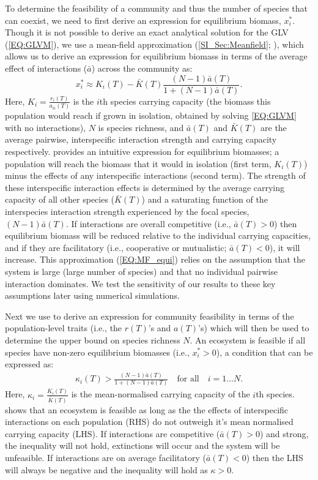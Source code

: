 \documentclass{article}
\begin{document}
To determine the feasibility of a community and thus the number of species that can coexist, we need to first derive an expression for equilibrium biomass, $x^*_i$. Though it is not possible to derive an exact analytical solution for the GLV (\cref{EQ:GLVM}), we use a mean-field approximation (\cref{SI_Sec:Meanfield};  \citet{Wilson2003,Wilson2004}), which allows us to derive an expression for equilibrium biomass in terms of the average effect of interactions ($\bar{a}$) across the community as: 
\begin{equation}\label{EQ:MF_equi}
  x^*_i \approx K_i(T) -  \bar{K}(T)  \frac{ (N-1)\bar{a}(T)}{1 + (N-1)\bar{a}(T)}. 
\end{equation}
Here, $K_i = \frac{r_i(T)}{a_{ii}(T)}$ is the $i$th species carrying capacity (the biomass this population would reach if grown in isolation, obtained by solving \cref{EQ:GLVM} with no interactions), $N$ is species richness, and $\bar{a}(T)$ and $\bar{K}(T)$ are the average pairwise, interspecific interaction strength and carrying capacity respectively.  provides an intuitive expression for equilibrium biomasses; a population will reach the biomass that it would in isolation (first term, $K_i(T)$) minus the effects of any interspecific interactions (second term). The strength of these interspecific interaction effects is determined by the average carrying capacity of all other species ($\bar{K}(T)$) and a saturating function of the interspecies interaction strength experienced by the focal species, $(N-1)\bar{a}(T)$. If interactions are overall competitive (i.e., $\bar{a}(T) > 0$) then equilibrium biomass will be reduced relative to the individual carrying capacities, and if they are facilitatory (i.e., cooperative or mutualistic; $ \bar{a}(T) < 0$), it will increase. This approximation (\cref{EQ:MF_equi}) relies on the assumption that the system is large (large number of species) and that no individual pairwise interaction dominates. We test the sensitivity of our results to these key assumptions later using numerical simulations.

Next we use  to derive an expression for community feasibility in terms of the population-level traits (i.e., the $r(T)$'s and $a(T)$'s) which will then be used to determine the upper bound on species richness $N$. An ecosystem is feasible if all species have non-zero equilibrium biomasses (i.e., $x_i^* > 0 $), a condition that can be expressed as:
\begin{align} \label{EQ:Feas_sp}
  \kappa_i(T) > \frac{(N-1)\bar{a}(T)}{1 + (N-1)\bar{a}(T)} \quad \text{for all} \quad i = 1 \ldots N.
\end{align}
Here, $\kappa_i = \frac{K_i(T)}{\bar{K}(T)}$ is the mean-normalised carrying capacity of the $i$th species.  shows that an ecosystem is feasible as long as the the effects of interspecific interactions on each population (RHS) do not outweigh it's mean normalised carrying capacity (LHS). If interactions are competitive ($\bar{a}(T) > 0$) and strong, the inequality will not hold, extinctions will occur and the system will be unfeasible. If interactions are on average facilitatory ($\bar{a}(T) < 0$) then the LHS will always be negative and the inequality will hold as $\kappa > 0$. 
\end{document}
